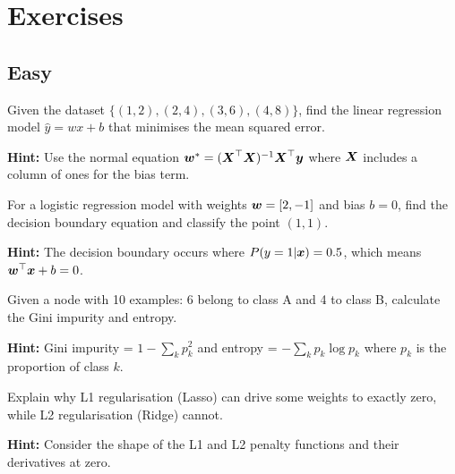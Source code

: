 
\section*{Exercises}

\subsection*{Easy}

\begin{problem}
\label{prob:linear-regression-basics}
Given the dataset $\{(1, 2), (2, 4), (3, 6), (4, 8)\}$, find the linear regression model $\hat{y} = wx + b$ that minimises the mean squared error.

\textbf{Hint:} Use the normal equation $\boldsymbol{w}^* = (\boldsymbol{X}^\top \boldsymbol{X})^{-1} \boldsymbol{X}^\top \boldsymbol{y}$ where $\boldsymbol{X}$ includes a column of ones for the bias term.
\end{problem}

\begin{problem}
\label{prob:logistic-decision-boundary}
For a logistic regression model with weights $\boldsymbol{w} = [2, -1]$ and bias $b = 0$, find the decision boundary equation and classify the point $(1, 1)$.

\textbf{Hint:} The decision boundary occurs where $P(y=1|\boldsymbol{x}) = 0.5$, which means $\boldsymbol{w}^\top \boldsymbol{x} + b = 0$.
\end{problem}

\begin{problem}
\label{prob:decision-tree-splitting}
Given a node with 10 examples: 6 belong to class A and 4 to class B, calculate the Gini impurity and entropy.

\textbf{Hint:} Gini impurity = $1 - \sum_{k} p_k^2$ and entropy = $-\sum_{k} p_k \log p_k$ where $p_k$ is the proportion of class $k$.
\end{problem}

\begin{problem}
\label{prob:regularization-effect}
Explain why L1 regularisation (Lasso) can drive some weights to exactly zero, while L2 regularisation (Ridge) cannot.

\textbf{Hint:} Consider the shape of the L1 and L2 penalty functions and their derivatives at zero.
\end{problem}

